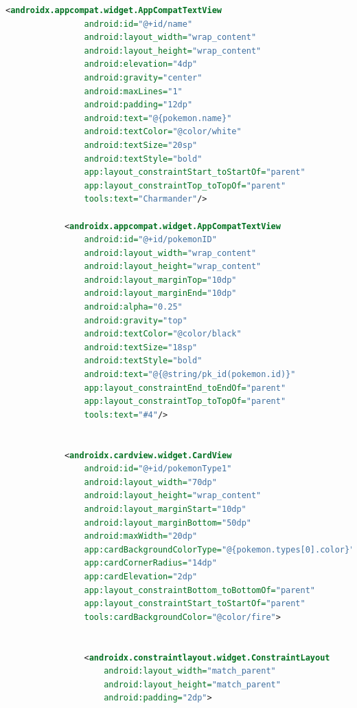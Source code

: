 \documentclass[a4paper, 12pt]{article}
\begin{document}
\begin{lstlisting}[caption={Binding property Region.}, label={code:binding_region_code}, language=XML]
            <androidx.appcompat.widget.AppCompatTextView
                android:id="@+id/name"
                android:layout_width="wrap_content"
                android:layout_height="wrap_content"
                android:elevation="4dp"
                android:gravity="center"
                android:maxLines="1"
                android:padding="12dp"
                android:text="@{pokemon.name}"
                android:textColor="@color/white"
                android:textSize="20sp"
                android:textStyle="bold"
                app:layout_constraintStart_toStartOf="parent"
                app:layout_constraintTop_toTopOf="parent"
                tools:text="Charmander"/>

            <androidx.appcompat.widget.AppCompatTextView
                android:id="@+id/pokemonID"
                android:layout_width="wrap_content"
                android:layout_height="wrap_content"
                android:layout_marginTop="10dp"
                android:layout_marginEnd="10dp"
                android:alpha="0.25"
                android:gravity="top"
                android:textColor="@color/black"
                android:textSize="18sp"
                android:textStyle="bold"
                android:text="@{@string/pk_id(pokemon.id)}"
                app:layout_constraintEnd_toEndOf="parent"
                app:layout_constraintTop_toTopOf="parent"
                tools:text="#4"/>


            <androidx.cardview.widget.CardView
                android:id="@+id/pokemonType1"
                android:layout_width="70dp"
                android:layout_height="wrap_content"
                android:layout_marginStart="10dp"
                android:layout_marginBottom="50dp"
                android:maxWidth="20dp"
                app:cardBackgroundColorType="@{pokemon.types[0].color}"
                app:cardCornerRadius="14dp"
                app:cardElevation="2dp"
                app:layout_constraintBottom_toBottomOf="parent"
                app:layout_constraintStart_toStartOf="parent"
                tools:cardBackgroundColor="@color/fire">


                <androidx.constraintlayout.widget.ConstraintLayout
                    android:layout_width="match_parent"
                    android:layout_height="match_parent"
                    android:padding="2dp">


\end{lstlisting}
\end{document}
